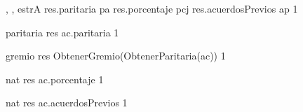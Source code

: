 {, , }{estrA}
{
	\state res.paritaria \asig pa								
	\state res.porcentaje \asig pcj								
	\state res.acuerdosPrevios \asig ap							
}
{1}
{}

{}{paritaria}
{
	\state res \asig ac.paritaria 								
}
{1}
{}

{}{gremio}
{
	\state res \asig ObtenerGremio(ObtenerParitaria(ac)) 		
}
{1}
{}

{}{nat}
{
	\state res \asig ac.porcentaje		
}
{1}
{}

{}{nat}
{
	\state res \asig ac.acuerdosPrevios	
}
{1}
{}